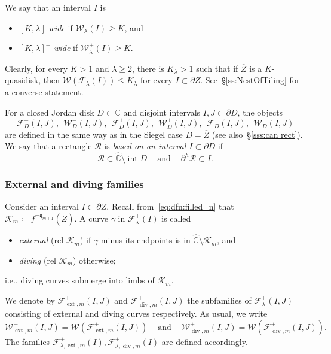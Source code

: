 \documentclass{amsart}
\renewcommand{\sp}{{\ \ }}
\newcommand{\1}{{\mathbb 1 }}
\newcommand{\ext}{{\operatorname{ext}}}
\renewcommand{\div}{{\operatorname{div}}}
\newcommand{\Fam}{{\mathcal F}}
\newcommand{\Width}{{\mathcal W}}
\newcommand\RR{\mathcal{R}}
\newcommand\intr{\operatorname{int}}
\newcommand{\qq}{\mathfrak{q}}
\newcommand{\wC}{\widehat{\mathbb{C}}}
\newcommand{\C}{\mathbb{C}}
\newcommand{\ovZ}{{\overline Z}}
\newcommand{\Dbb}{{\mathfrak{D}}}
\theoremstyle{remark}
\numberwithin{equation}{section}
\theoremstyle{definition}
\newcommand{\filled}{{\mathcal {K} }}
\begin{document}
We say that an interval $I$ is
\begin{itemize}
\item \emph{$[K,\lambda]$-wide} if $\Width_\lambda(I)\ge K$, and
\item  \emph{$[K,\lambda]^+$-wide} if $\Width^+_\lambda(I)\ge K$.
\end{itemize}


Clearly, for every $K>1$ and $\lambda\ge 2$, there is $K_\lambda>1$ such that if $\ovZ$ is a $K$-quasidisk, then $\Width(\Fam_\lambda (I))\le K_\lambda$ for every $I\subset \partial Z$.  See~\S\ref{ss:NestOfTiling} for a converse statement.


For a closed Jordan disk $D\subset \C$ and disjoint intervals $I,J\subset \partial D$, the objects \[\Fam_D^-(I,J),\sp \Width_D^-(I,J), \sp \Fam_D^+(I,J), \sp \Width_D^+(I,J),\sp  \Fam_D(I,J),\sp  \Width_D(I,J)\] are defined in the same way as in the Siegel case $D=\overline Z$ (see also~\S\ref{sss:can rect}). We say that a rectangle $\RR$ is \emph{based on an interval $I\subset \partial D$} if 
\begin{equation}
\label{eq:dfn:based on} \RR\subset \wC\setminus \intr D \sp\sp\text{ and }\sp\sp \partial ^h\RR \subset I. 
\end{equation}

\subsubsection{External and diving families}
\label{sss:ext div famil} 

Consider an interval $I\subset \partial Z$. Recall from~\eqref{eq:dfn:filled_n} that $\filled_m\coloneqq f^{-\qq_{m+1} } (\overline Z)$. A curve $\gamma$ in $\Fam_\lambda^+(I)$ is called 
\begin{itemize}
\item \emph{external} (rel $\filled_m$) if $\gamma$ minus its endpoints is in $\wC\setminus \filled_m$, and 
\item \emph{diving} (rel $\filled_m$) otherwise;
\end{itemize}
i.e., diving curves submerge into limbs of $\filled_m$.


We denote by $\Fam^+_{\ext,m}(I,J)$ and $\Fam^+_{\div,m}(I,J)$ the subfamilies of $\Fam_{\lambda}^+(I,J)$ consisting of external and diving curves respectively. As usual, we write 
\[\Width^+_{\ext,m}(I,J)=\Width\left(\Fam^+_{\ext,m}(I,J)\right)\sp\sp\text{ and }\sp\sp \Width^+_{\div,m}(I,J)=\Width\left(\Fam^+_{\div,m}(I,J)\right).\]
The families $\Fam^+_{\lambda,\ext,m}(I),\Fam^+_{\lambda,\div,m}(I)$ are defined accordingly.
\end{document}
